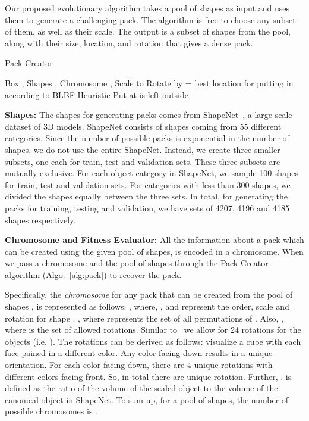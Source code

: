 \documentclass{article}
\begin{document}
Our proposed evolutionary algorithm takes a pool of shapes as input and uses them to generate a challenging pack. The algorithm is free to choose any subset of them, as well as their scale. The output is a subset of shapes from the pool, along with their size, location, and rotation that gives a dense pack. 

\begin{algorithm}[t]
    \caption{Pack Creator}
    \label{alg:pack}
    \begin{algorithmic}
         Box , Shapes , Chromosome , 
        \STATE Scale  to 
        \STATE Rotate  by  
            \STATE  = best location for putting  in  according to BLBF Heuristic
            \STATE Put  at 
       \ELSE
            \STATE  is left outside 
       \ENDIF
       \ENDFOR
    \end{algorithmic}
\end{algorithm}
\noindent \textbf{Shapes: }The shapes for generating packs comes from ShapeNet~\cite{shapenet2015}, a large-scale dataset of 3D models. ShapeNet consists of  shapes coming from 55 different categories. Since the number of possible packs is exponential in the number of shapes, we do not use the entire ShapeNet. Instead, we create three smaller subsets, one each for train, test and validation sets. These three subsets are mutually exclusive. For each object category in ShapeNet, we sample 100 shapes for train, test and validation sets. For categories with less than 300 shapes, we divided the shapes equally between the three sets. In total, for generating the packs for training, testing and validation, we have sets of 4207, 4196 and 4185 shapes respectively.

\noindent \textbf{Chromosome and Fitness Evaluator: }All the information about a pack which can be created using the given pool of shapes, is encoded in a chromosome. When we pass a chromosome and the pool of shapes through the Pack Creator algorithm (Algo.~\ref{alg:pack}) to recover the pack.  

Specifically, the \textit{chromosome} for any pack that can be created from the pool of shapes , is represented as follows:
, where, ,  and  represent the order, scale and rotation for shape . , where  represents the set of all permutations of . Also, , where  is the set of allowed rotations. Similar to~\cite{tiwari2010fast} we allow for 24 rotations for the objects (i.e. ). The rotations can be derived as follows: visualize a cube with each face pained in a different color. Any color facing down results in a unique orientation. For each color facing down, there are 4 unique rotations with different colors facing front. So, in total there are  unique rotation. Further, .  is defined as the ratio of the volume of the scaled object to the volume of the canonical object in ShapeNet. To sum up, for a pool of  shapes, the number of possible chromosomes is .
\end{document}
